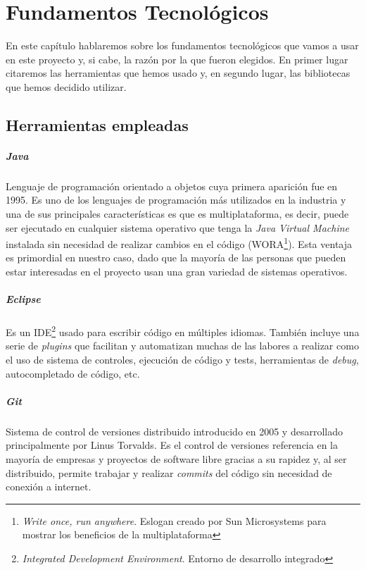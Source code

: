 \chapter{Fundamentos Tecnológicos}

En este capítulo hablaremos sobre los fundamentos tecnológicos que vamos a usar en este proyecto y, si cabe, la razón por la que fueron elegidos. En primer lugar citaremos las herramientas que hemos usado y, en segundo lugar, las bibliotecas que hemos decidido utilizar.

\section{Herramientas empleadas}

\paragraph{Java} Lenguaje de programación orientado a objetos cuya primera aparición fue en 1995. Es uno de los lenguajes de programación más utilizados en la industria y una de sus principales características es que es multiplataforma, es decir, puede ser ejecutado en cualquier sistema operativo que tenga la \textit{Java Virtual Machine} instalada sin necesidad de realizar cambios en el código (WORA\footnote{\textit{Write once, run anywhere}. Eslogan creado por Sun Microsystems para mostrar los beneficios de la multiplataforma}). Esta ventaja es primordial en nuestro caso, dado que la mayoría de las personas que pueden estar interesadas en el proyecto usan una gran variedad de sistemas operativos.

 \paragraph{Eclipse} Es un IDE\footnote{\textit{Integrated Development Environment}. Entorno de desarrollo integrado} usado para escribir código en múltiples idiomas. También incluye una serie de \textit{plugins} que facilitan y automatizan muchas de las labores a realizar como el uso de sistema de controles, ejecución de código y tests, herramientas de \textit{debug}, autocompletado de código, etc.

 \paragraph{Git} Sistema de control de versiones distribuido introducido en 2005 y desarrollado principalmente por Linus Torvalds. Es el control de versiones referencia en la mayoría de empresas y proyectos de software libre gracias a su rapidez y, al ser distribuido, permite trabajar y realizar \textit{commits} del código sin necesidad de conexión a internet.

